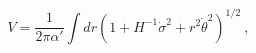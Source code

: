 \begin{equation}
V=\frac{1}{2\pi\alpha'}\int dr (1+H^{-1}\dot \sigma^2+r^2 \dot 
\theta^2)^{1/2}\ 
,
\end{equation}

